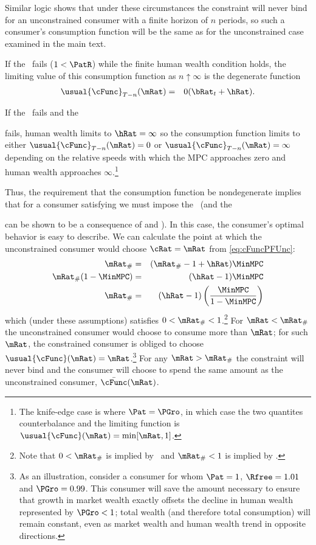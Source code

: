 \documentclass[./BufferStockTheory.tex]{subfiles}
\begin{document}
Similar logic shows that under these circumstances the constraint will
never bind for an unconstrained consumer with a finite horizon of $n$
periods, so such a consumer's consumption function will be the same as for the
unconstrained case examined in the main text.

If the \RIC~fails ($1 < \PatR$) while the finite human wealth condition
holds, the limiting value of this consumption function as $n \uparrow
\infty$ is the degenerate function
\begin{eqnarray}
  \usual{\cFunc}_{T-n}(\mRat) & = & 0 (\bRat_{t}+\hRat).
\end{eqnarray}

If the \RIC~fails and the \FHWC~





fails, human wealth limits to $\hRat =
\infty$ so the consumption function limits to either
$\usual{\cFunc}_{T-n}(\mRat) = 0$ or
$\usual{\cFunc}_{T-n}(\mRat) = \infty$ depending on the relative
speeds with which the MPC approaches zero and human wealth approaches
$\infty$.\footnote{The knife-edge case is where $\Pat = \PGro$, in
  which case the two quantites counterbalance and the limiting
  function is $\usual{\cFunc}(\mRat)=\min[\mRat,1]$.}

Thus, the requirement that the consumption function be nondegenerate
implies that for a consumer satisfying \cncl{\GICRaw} we must impose
the \RIC~(and the \FHWC~





can be shown to be a consequence of \cncl{\GICRaw} and \RIC).  In
this case, the consumer's optimal behavior is easy to describe.  We
can calculate the point at which the unconstrained consumer would
choose $\cRat = \mRat$ from \eqref{eq:cFuncPFUnc}:
\begin{eqnarray}
  \mRat_{\#} & = & (\mRat_{\#}-1+\hRat)\MinMPC
\\ \mRat_{\#}(1-\MinMPC) & = & (\hRat - 1)\MinMPC
\\ \mRat_{\#} & = & (\hRat - 1)\left(\frac{\MinMPC}{1-\MinMPC}\right)
\end{eqnarray}
which (under these assumptions) satisfies $0 < \mRat_{\#} < 1$.\footnote{Note that $0 < \mRat_{\#}$ is implied by \RIC~and $ \mRat_{\#}<1$ is implied by \cncl{\GICRaw}.}  For
$\mRat < \mRat_{\#}$ the unconstrained consumer would choose to
consume more than $\mRat$; for such $\mRat$, the constrained consumer
is obliged to choose $\usual{\cFunc}(\mRat) = \mRat$.\footnote{As an
  illustration, consider a consumer for whom $\Pat = 1$, $\Rfree
  =1.01$ and $\PGro = 0.99$.  This consumer will save the amount
  necessary to ensure that growth in market wealth exactly offsets the
  decline in human wealth represented by $\PGro < 1$; total wealth
  (and therefore total consumption) will remain constant, even as
  market wealth and human wealth trend in opposite directions.}  For
any $\mRat > \mRat_{\#}$ the constraint will never bind and the
consumer will choose to spend the same amount as the unconstrained
consumer, $\bar{\cFunc}(\mRat)$.
\end{document}
